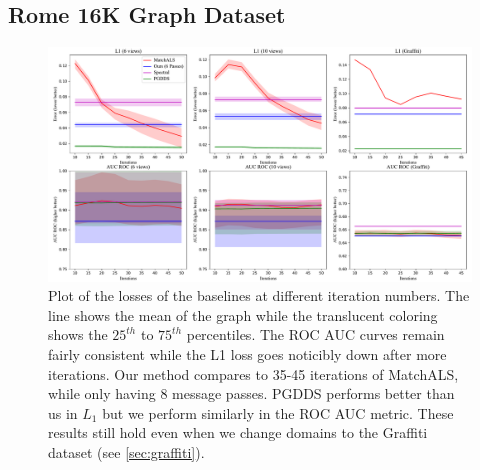 \documentclass{article} %
\begin{document}
\subsection{Rome 16K Graph Dataset}

\begin{figure}[t]
\centering
\includegraphics[width=0.95\linewidth]{figures-error_lines.pdf}
\caption{
  Plot of the losses of the baselines at different iteration numbers.
  The line shows the mean of the graph while the translucent coloring shows the $25^{th}$ to $75^{th}$ percentiles.
  The ROC AUC curves remain fairly consistent while the L1 loss goes noticibly down after more iterations.
  Our method compares to 35-45 iterations of MatchALS, while only having 8 message passes.
  PGDDS performs better than us in $L_1$ but we perform similarly in the ROC AUC metric.
  These results still hold even when we change domains to the Graffiti dataset (see \ref{sec:graffiti}).
}
\label{fig:3}
\label{fig:errorlines}
\end{figure}
\end{document}
